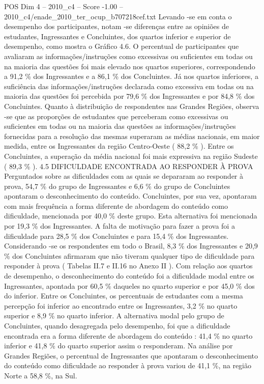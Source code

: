 \begin{textsample}{POS Dim 4 – 2010\_c4 – Score -1.00 – 2010\_c4/enade\_2010\_ter\_ocup\_b707218cef.txt}
Levando -se em conta o desempenho dos participantes, notam -se diferenças entre as opiniões de estudantes, Ingressantes e Concluintes, dos quartos inferior e superior de desempenho, como mostra o Gráfico 4.6.
O percentual de participantes que avaliaram as informações/instruções como excessivas ou suficientes em todas ou na maioria das questões foi mais elevado nos quartos superiores, correspondendo a 91,2 \% dos Ingressantes e a 86,1 \% dos Concluintes.
Já nos quartos inferiores, a suficiência das informações/instruções declarada como excessiva em todas ou na maioria das questões foi percebida por 79,6 \% dos Ingressantes e por 84,8 \% dos Concluintes.
Quanto à distribuição de respondentes nas Grandes Regiões, observa -se que as proporções de estudantes que perceberam como excessivas ou suficientes em todas ou na maioria das questões as informações/instruções fornecidas para a resolução das mesmas superaram as médias nacionais, em maior medida, entre os Ingressantes da região Centro-Oeste ( 88,2 \% ).
Entre os Concluintes, a superação da média nacional foi mais expressiva na região Sudeste ( 89,3 \% ). 4.5 DIFICULDADE ENCONTRADA AO RESPONDER À PROVA Perguntados sobre as dificuldades com as quais se depararam ao responder à prova, 54,7 \% do grupo de Ingressantes e 6,6 \% do grupo de Concluintes apontaram o desconhecimento do conteúdo.
Concluintes, por sua vez, apontaram com mais frequência a forma diferente de abordagem do conteúdo como dificuldade, mencionada por 40,0 \% deste grupo.
Esta alternativa foi mencionada por 19,3 \% dos Ingressantes.
A falta de motivação para fazer a prova foi a dificuldade para 28,5 \% dos Concluintes e para 15,4 \% dos Ingressantes.
Considerando -se os respondentes em todo o Brasil, 8,3 \% dos Ingressantes e 20,9 \% dos Concluintes afirmaram que não tiveram qualquer tipo de dificuldade para responder à prova ( Tabelas II.7 e II.16 no Anexo II ).
Com relação aos quartos de desempenho, o desconhecimento do conteúdo foi a dificuldade modal entre os Ingressantes, apontada por 60,5 \% daqueles no quarto superior e por 45,0 \% dos do inferior.
Entre os Concluintes, os percentuais de estudantes com a mesma percepção foi inferior ao encontrado entre os Ingressantes, 3,2 \% no quarto superior e 8,9 \% no quarto inferior.
A alternativa modal pelo grupo de Concluintes, quando desagregada pelo desempenho, foi que a dificuldade encontrada era a forma diferente de abordagem do conteúdo : 41,4 \% no quarto inferior e 41,8 \% do quarto superior assim o responderam.
Na análise por Grandes Regiões, o percentual de Ingressantes que apontaram o desconhecimento do conteúdo como dificuldade ao responder à prova variou de 41,1 \%, na região Norte a 58,8 \%, na Sul.

\end{textsample}
